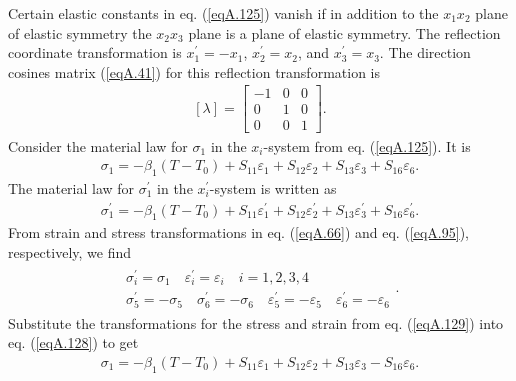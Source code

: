 \documentclass{AeroStructure-ERJohnson}
\begin{document}
Certain elastic constants in eq. (\ref{eqA.125}) vanish if in addition to the $x_{1} x_{2}$ plane of elastic symmetry the $x_{2} x_{3}$ plane is a plane of elastic symmetry. The reflection coordinate transformation is $x_{1}^{\prime}=-x_{1}$, $x_{2}^{\prime}=x_{2}$, and $x_{3}^{\prime}=x_{3}$. The direction cosines matrix (\ref{eqA.41}) for this reflection transformation is
\begin{align}\label{eqA.126}
[\lambda]=\left[\begin{array}{ccc}-1 & 0 & 0 \\0 & 1 & 0 \\0 & 0 & 1\end{array}\right].
\end{align}
Consider the material law for $\sigma_{1}$ in the $x_{i}$-system from eq. (\ref{eqA.125}). It is
\begin{align}\label{eqA.127}
\sigma_{1}=-\beta_{1}(T-T_{0})+S_{11} \varepsilon_{1}+S_{12} \varepsilon_{2}+S_{13} \varepsilon_{3}+S_{16} \varepsilon_{6}.
\end{align}
The material law for $\sigma_{1}^{\prime}$ in the $x_{i}^{\prime}$-system is written as
\begin{align}\label{eqA.128}
\sigma_{1}^{\prime}=-\beta_{1}(T-T_{0})+S_{11} \varepsilon_{1}^{\prime}+S_{12} \varepsilon_{2}^{\prime}+S_{13} \varepsilon_{3}^{\prime}+S_{16} \varepsilon_{6}^{\prime}.
\end{align}
From strain and stress transformations in eq. (\ref{eqA.66}) and eq. (\ref{eqA.95}), respectively, we find
\begin{align}\label{eqA.129}
\begin{gathered}
\sigma_{i}^{\prime}=\sigma_{1} \quad \varepsilon_{i}^{\prime}=\varepsilon_{i} \quad i=1,2,3,4 \\
\sigma_{5}^{\prime}=-\sigma_{5} \quad \sigma_{6}^{\prime}=-\sigma_{6} \quad \varepsilon_{5}^{\prime}=-\varepsilon_{5} \quad \varepsilon_{6}^{\prime}=-\varepsilon_{6}
\end{gathered}.
\end{align}
Substitute the transformations for the stress and strain from eq. (\ref{eqA.129}) into eq. (\ref{eqA.128}) to get\vspace*{-2pt}
\begin{align}\label{eqA.130}
\sigma_{1}=-\beta_{1}(T-T_{0})+S_{11} \varepsilon_{1}+S_{12} \varepsilon_{2}+S_{13} \varepsilon_{3}-S_{16} \varepsilon_{6}.
\end{align}

\vspace*{-1pc}
\end{document}
